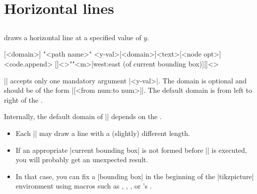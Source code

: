 




\section{Horizontal lines}
\label{s:tzhfn}

\subsection{\protect\cmd{\tzhfnat}}
\label{ss:tzhfnat}

\icmd{\tzhfnat} draws a horizontal line at a specified value of $y$.


\begin{tzdef}{}
[<domain>]
"<path name>"
        {<y-val>}[<domain>]{<text>}[<node opt>]<code.append>
  []<>""{<m>}[west:east (of current bounding box)]{}[]<>
\end{tzdef}


|\tzhfnat| accepts only one mandatory argument |{<y-val>}|.
The domain is optional and should be of the form |[<from num:to num>]|.
The default domain is from left to right of the .

\remark Internally, the default domain of |\tzhfnat| depends on the .
\begin{itemize}
\item Each |\tzhfnat| may draw a line with a (slightly) different length.
\item If an appropriate |current bounding box| is not formed before |\tzhfnat| is executed, you will probably get an unexpected result.
\item In that case, you can fix a |bounding box| in the beginning of the |tikzpicture| environment using macros such as \icmd{\tzbbox}, \icmd{\tzhelplines*}, \icmd{\tzaxes*}, or \Tikz's \icmd{\useasboundingbox}.
\end{itemize}


